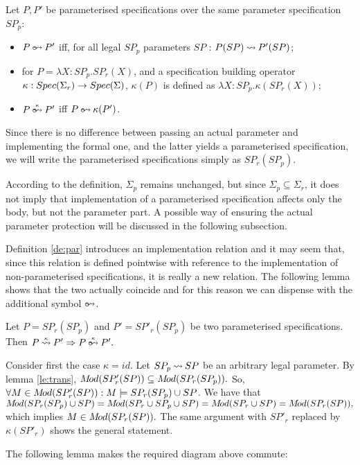 \begin{DEFINITION}\label{de:par}
Let $P,P'$ be parameterised specifications over the same parameter specification $SP_p$: \begin{itemize}
\item $P\pim P'$ iff, for all legal $SP_p$ parameters $SP$ : $P(SP)\mathbin{\leadsto} P'(SP)$;
\item for $P = \lambda X:SP_p.SP_r(X)$, and a specification building operator $\kappa:Spec(\Sigma_r)\rightarrow Spec(\Sigma)$, $\kappa(P)$ is defined as $\lambda X:SP_p.\kappa(SP_r(X))$; \item $P\pimm{\kappa} P'$ iff $P\pim \kappa(P')$. \end{itemize}
\end{DEFINITION}
\noindent Since there is no difference between passing an actual parameter and
implementing the formal one, and the latter yields a parameterised specification, we will write the parameterised specifications simply as $SP_r(SP_p)$.

According to the definition, $\Sigma_p$ remains unchanged, but since $\Sigma_p\subseteq \Sigma_r$, it does not imply that implementation of a parameterised specification affects only the body, but not the parameter part. A possible way of ensuring
the actual parameter protection will be discussed in the following subsection.

Definition \ref{de:par} introduces an implementation relation and it may seem that,
since this relation is defined pointwise with reference to the implementation of non-parameterised specifications, it is really a new relation. The following lemma shows that the two actually coincide and for this reason we can dispense with the additional symbol $\pim$. 

\begin{LEMMA}\label{le:onlybody}
Let $P= SP_r(SP_p)$ and $P'=SP'_r(SP_p)$ be two parameterised specifications. Then $P\imm\kappa P' \impl P\pimm{\kappa} P'.$ \end{LEMMA}
\begin{PROOF}
Consider first the case $\kappa=id.$ Let $SP_p\mathbin{\leadsto} SP$ be an arbitrary legal parameter.
By lemma \ref{le:trans}, $M\!od(SP'_r(SP))\subseteq M\!od(SP_r(SP_p)).$ So, $\forall M\in M\!od(SP'_r(SP)):M\models SP_r(SP_p) \cup SP$. We have that
$M\!od(SP_r(SP_p)\cup SP)=M\!od(SP_r\cup SP_p\cup SP)=M\!od(SP_r\cup SP)= M\!od(SP_r(SP)),$
which implies $M\in M\!od(SP_r(SP)).$
The same argument with $SP'_r$ replaced by $\kappa(SP'_r)$ shows the general statement.
\end{PROOF}
The following lemma makes the required diagram above commute: 

